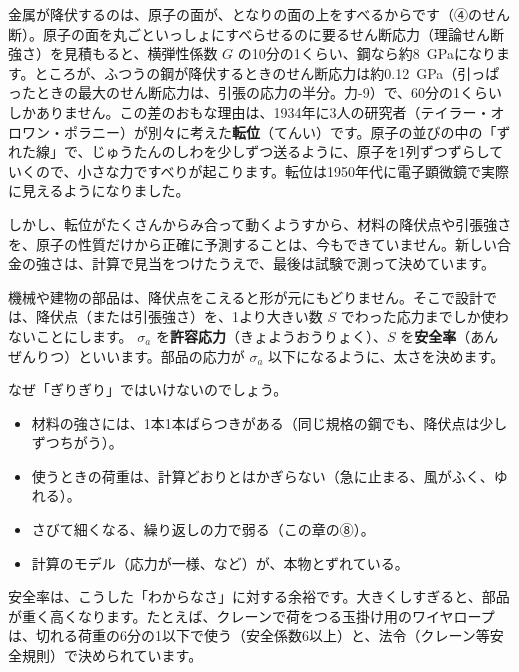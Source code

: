 \begin{phmada}
金属が降伏するのは、原子の面が、となりの面の上をすべるからです（④のせん断）。原子の面を丸ごといっしょにすべらせるのに要るせん断応力（理論せん断強さ）を見積もると、横弾性係数 $G$ の10分の1くらい、鋼なら約\qty{8}{GPa}になります。ところが、ふつうの鋼が降伏するときのせん断応力は約\qty{0.12}{GPa}（引っぱったときの最大のせん断応力は、引張の応力の半分。力-9）で、60分の1くらいしかありません。この差のおもな理由は、1934年に3人の研究者（テイラー・オロワン・ポラニー）が別々に考えた\textbf{転位}（てんい）です。原子の並びの中の「ずれた線」で、じゅうたんのしわを少しずつ送るように、原子を1列ずつずらしていくので、小さな力ですべりが起こります。転位は1950年代に電子顕微鏡で実際に見えるようになりました。

しかし、転位がたくさんからみ合って動くようすから、材料の降伏点や引張強さを、原子の性質だけから正確に予測することは、今もできていません。新しい合金の強さは、計算で見当をつけたうえで、最後は試験で測って決めています。
\end{phmada}

\leavevmode\label{ph:力-8:sec6}機械や建物の部品は、降伏点をこえると形が元にもどりません。そこで設計では、降伏点（または引張強さ）を、1より大きい数 $S$ でわった応力までしか使わないことにします。
$\sigma_a$ を\textbf{許容応力}（きょようおうりょく）、$S$ を\textbf{安全率}（あんぜんりつ）といいます。部品の応力が $\sigma_a$ 以下になるように、太さを決めます。

なぜ「ぎりぎり」ではいけないのでしょう。
\begin{itemize}[leftmargin=1.2\zw, itemsep=1pt, topsep=1pt, label={\color{bkTheme}●}]
\item 材料の強さには、1本1本ばらつきがある（同じ規格の鋼でも、降伏点は少しずつちがう）。
\item 使うときの荷重は、計算どおりとはかぎらない（急に止まる、風がふく、ゆれる）。
\item さびて細くなる、繰り返しの力で弱る（この章の⑧）。
\item 計算のモデル（応力が一様、など）が、本物とずれている。
\end{itemize}
安全率は、こうした「わからなさ」に対する余裕です。大きくしすぎると、部品が重く高くなります。たとえば、クレーンで荷をつる玉掛け用のワイヤロープは、切れる荷重の6分の1以下で使う（安全係数6以上）と、法令（クレーン等安全規則）で決められています。

